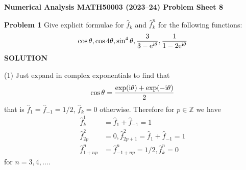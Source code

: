 \documentclass[12pt,a4paper]{article}
\def\endash{–}
\def\bbZ{ {\mathbb Z} }
\begin{document}
\textbf{Numerical Analysis MATH50003 (2023\ensuremath{\endash}24) Problem Sheet 8}

\textbf{Problem 1} Give explicit formulae for $\hat f_k$ and $\hat f_k^n$ for the following functions:
\[
\cos \ensuremath{\theta}, \cos 4\ensuremath{\theta}, \sin^4\ensuremath{\theta}, {3 \over 3 - {\rm e}^{\rm i \ensuremath{\theta}}}, {1 \over 1 - 2{\rm e}^{\rm i \ensuremath{\theta}}}
\]
\textbf{SOLUTION}

(1) Just expand in complex exponentials to find that
\[
\cos \ensuremath{\theta} = {\exp({\rm i} \ensuremath{\theta}) + \exp(-{\rm i} \ensuremath{\theta}) \over 2}
\]
that is $\hat f_1 = \hat f_{-1} = 1/2$, $\hat f_k = 0$ otherwise. Therefore for $p\ensuremath{\in} \ensuremath{\bbZ}$ we have
\begin{align*}
\hat f_k^1 &= \hat f_1 + \hat f_{-1} = 1 \\
\hat f_{2p}^2 &= 0, \hat f_{2p+1}^2 = \hat f_1 + \hat f_{-1} = 1 \\
\hat f_{1+np}^n &= \hat f_{-1+np}^n = 1/2, \hat f_k^n = 0
\end{align*}
for $n = 3,4,\ensuremath{\ldots}$.
\end{document}
